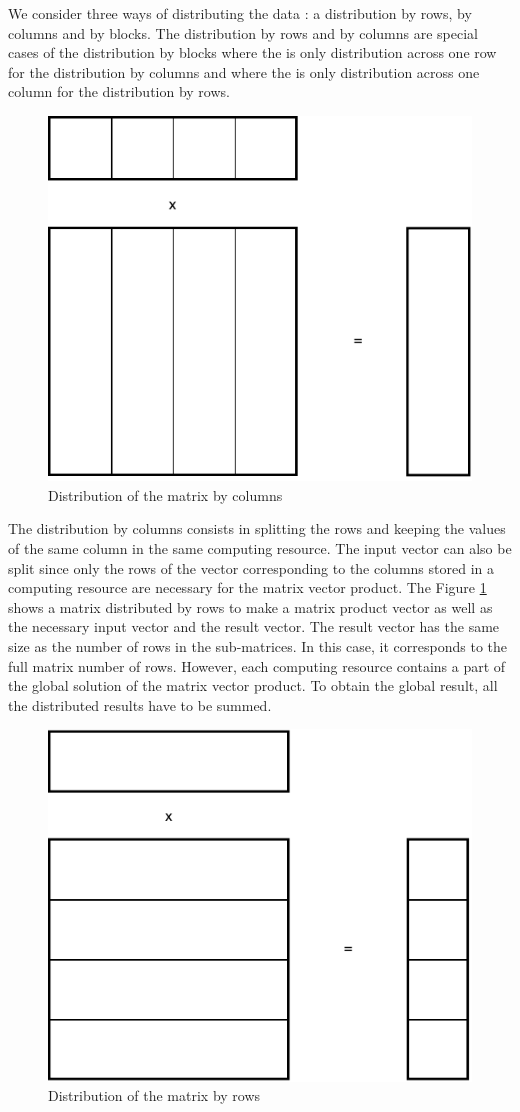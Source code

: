 We consider three ways of distributing the data : a distribution by rows, by columns and by blocks.
The distribution by rows and by columns are special cases of the distribution by blocks where the is only distribution across one row for the distribution by columns and where the is only distribution across one column for the distribution by rows.


\begin{figure}[h]
	\centering
	\includegraphics[width=.5\textwidth]{pmv_c}
	\caption{Distribution of the matrix by columns \label{fig:sparse:pmv_c}}
\end{figure}

The distribution by columns consists in splitting the rows and keeping the values of the same column in the same computing resource.
The input vector can also be split since only the rows of the vector corresponding to the columns stored in a computing resource are necessary for the matrix vector product.
The Figure \ref{fig:sparse:pmv_c} shows a matrix distributed by rows to make a matrix product vector as well as the necessary input vector and the result vector.
The result vector has the same size as the number of rows in the sub-matrices.
In this case, it corresponds to the full matrix number of rows.
However, each computing resource contains a part of the global solution of the matrix vector product.
To obtain the global result, all the distributed results have to be summed.


\begin{figure}[h]
	\centering
	\includegraphics[width=.5\textwidth]{pmv_r}
	\caption{Distribution of the matrix by rows\label{fig:sparse:pmv_r}}
\end{figure}

